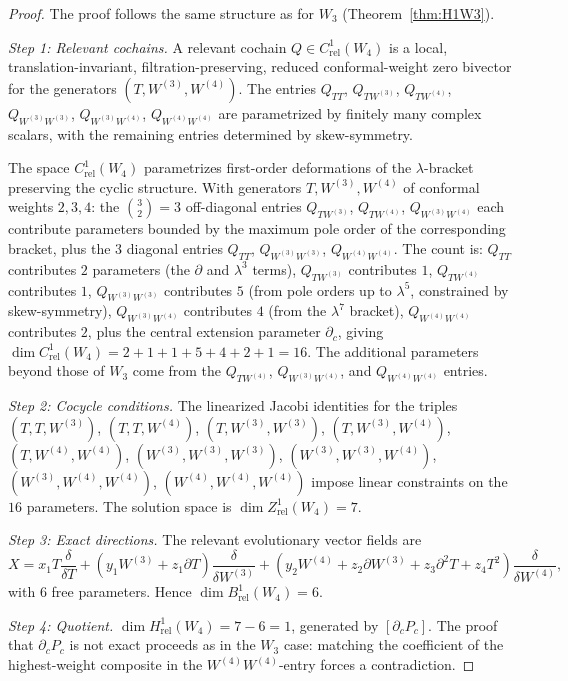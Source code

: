 \begin{proof}
The proof follows the same structure as for $W_3$
(Theorem~\ref{thm:H1W3}).

\emph{Step 1: Relevant cochains.}
A relevant cochain $Q \in C^1_{\mathrm{rel}}(W_4)$ is a local,
translation-invariant, filtration-preserving, reduced conformal-weight
zero bivector for the generators $(T, W^{(3)}, W^{(4)})$. The entries
$Q_{TT}$, $Q_{TW^{(3)}}$, $Q_{TW^{(4)}}$, $Q_{W^{(3)}W^{(3)}}$,
$Q_{W^{(3)}W^{(4)}}$, $Q_{W^{(4)}W^{(4)}}$ are parametrized by
finitely many complex scalars, with the remaining entries determined
by skew-symmetry.

The space $C^1_{\mathrm{rel}}(W_4)$ parametrizes first-order
deformations of the $\lambda$-bracket preserving the cyclic
structure. With generators $T, W^{(3)}, W^{(4)}$ of conformal
weights $2, 3, 4$: the $\binom{3}{2} = 3$ off-diagonal entries
$Q_{TW^{(3)}}$, $Q_{TW^{(4)}}$, $Q_{W^{(3)}W^{(4)}}$ each
contribute parameters bounded by the maximum pole order of the
corresponding bracket, plus the $3$ diagonal entries
$Q_{TT}$, $Q_{W^{(3)}W^{(3)}}$, $Q_{W^{(4)}W^{(4)}}$.
The count is: $Q_{TT}$ contributes $2$ parameters (the
$\partial$ and $\lambda^3$ terms), $Q_{TW^{(3)}}$ contributes
$1$, $Q_{TW^{(4)}}$ contributes $1$,
$Q_{W^{(3)}W^{(3)}}$ contributes $5$ (from pole orders up to
$\lambda^5$, constrained by skew-symmetry),
$Q_{W^{(3)}W^{(4)}}$ contributes $4$ (from the $\lambda^7$ bracket),
$Q_{W^{(4)}W^{(4)}}$ contributes $2$, plus the central extension
parameter $\partial_c$, giving
$\dim C^1_{\mathrm{rel}}(W_4) = 2+1+1+5+4+2+1 = 16$.
The additional parameters beyond those of $W_3$ come from the
$Q_{TW^{(4)}}$, $Q_{W^{(3)}W^{(4)}}$, and $Q_{W^{(4)}W^{(4)}}$ entries.

\emph{Step 2: Cocycle conditions.}
The linearized Jacobi identities for the triples
$(T,T,W^{(3)})$, $(T,T,W^{(4)})$,
$(T,W^{(3)},W^{(3)})$, $(T,W^{(3)},W^{(4)})$, $(T,W^{(4)},W^{(4)})$,
$(W^{(3)},W^{(3)},W^{(3)})$, $(W^{(3)},W^{(3)},W^{(4)})$,
$(W^{(3)},W^{(4)},W^{(4)})$, $(W^{(4)},W^{(4)},W^{(4)})$
impose linear constraints on the $16$ parameters. The solution space
is $\dim Z^1_{\mathrm{rel}}(W_4) = 7$.

\emph{Step 3: Exact directions.}
The relevant evolutionary vector fields are
\[
X = x_1 T\frac{\delta}{\delta T}
+ (y_1 W^{(3)} + z_1 \partial T)\frac{\delta}{\delta W^{(3)}}
+ (y_2 W^{(4)} + z_2 \partial W^{(3)} + z_3 \partial^2 T + z_4 T^2)
 \frac{\delta}{\delta W^{(4)}},
\]
with $6$ free parameters. Hence $\dim B^1_{\mathrm{rel}}(W_4) = 6$.

\emph{Step 4: Quotient.}
$\dim H^1_{\mathrm{rel}}(W_4) = 7 - 6 = 1$, generated by $[\partial_c P_c]$.
The proof that $\partial_c P_c$ is not exact proceeds as in the $W_3$
case: matching the coefficient of the highest-weight composite in the
$W^{(4)}W^{(4)}$-entry forces a contradiction.
\end{proof}

